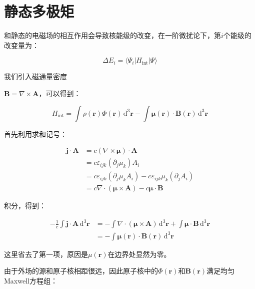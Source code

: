 \section{静态多极矩}

和静态的电磁场的相互作用会导致核能级的改变，在一阶微扰论下，第$i$个能级的改变量为：

\begin{equation}
\Delta E_{i}=\langle\Psi_{i}|H_{\text{int}}|\Psi\rangle
\end{equation}

我们引入磁通量密度

$\boldsymbol{B}=\nabla\times\boldsymbol{A}$，可以得到：

\begin{equation}
H_{\text{int}}=\int\rho(\boldsymbol{r})\Phi(\boldsymbol{r})\,\mathrm{d}^{3}\boldsymbol{r}-\int\boldsymbol{\mu}(\boldsymbol{r})\cdot\boldsymbol{B}(\boldsymbol{r})\,\mathrm{d}^{3}\boldsymbol{r}
\end{equation}

\begin{booknote*}
首先利用求和记号：

\begin{align*}
\boldsymbol{j}\cdot\boldsymbol{A} & =c(\nabla\times\boldsymbol{\mu})\cdot\boldsymbol{A}\\
 & =c\varepsilon_{ijk}(\partial_{j}\mu_{k})A_{i}\\
 & =c\varepsilon_{ijk}(\partial_{j}\mu_{k}A_{i})-c\varepsilon_{ijk}\mu_{k}(\partial_{j}A_{i})\\
 & =c\nabla\cdot(\boldsymbol{\mu}\times\boldsymbol{A})-c\boldsymbol{\mu}\cdot\boldsymbol{B}
\end{align*}

积分，得到：

\begin{align*}
-\frac{1}{c}\int\boldsymbol{j}\cdot\boldsymbol{A}\,\mathrm{d}^{3}\boldsymbol{r} & =-\int\nabla\cdot(\boldsymbol{\mu}\times\boldsymbol{A})\,\mathrm{d}^{3}\boldsymbol{r}+\int\boldsymbol{\mu}\cdot\boldsymbol{B}\,\mathrm{d}^{3}\boldsymbol{r}\\
 & =-\int\boldsymbol{\mu}(\boldsymbol{r})\cdot\boldsymbol{B}(\boldsymbol{r})\,\mathrm{d}^{3}\boldsymbol{r}
\end{align*}

这里省去了第一项，原因是$\mu(\boldsymbol{r})$在边界处显然为零。
\end{booknote*}
由于外场的源和原子核相距很远，因此原子核中的$\Phi(\boldsymbol{r})$和$\boldsymbol{B}(\boldsymbol{r})$满足均匀Maxwell方程组：

